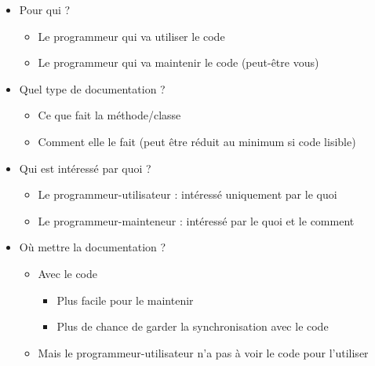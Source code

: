 \documentclass[11pt,a4paper]{article}
\begin{document}
					\begin{itemize}
				
			\item 
            Pour qui ?
            
					\begin{itemize}
				
			\item Le programmeur qui va utiliser le code
			\item Le programmeur qui va maintenir le code (peut-\^etre vous)
					\end{itemize}
				
			\item 
              Quel type de documentation ?
            
					\begin{itemize}
				
			\item Ce que fait la m\'ethode/classe
			\item Comment elle le fait (peut \^etre r\'eduit au minimum si code lisible)
					\end{itemize}
				
			\item 
              Qui est int\'eress\'e par quoi ?
            
					\begin{itemize}
				
			\item Le programmeur-utilisateur : int\'eress\'e uniquement par le quoi
			\item Le programmeur-mainteneur : int\'eress\'e par le quoi et le comment
					\end{itemize}
				
			\item 
              O\`u mettre la documentation ?
            
					\begin{itemize}
				
			\item 
                Avec le code
                  
					\begin{itemize}
				
			\item Plus facile pour le maintenir
			\item Plus de chance de garder la synchronisation avec le code
					\end{itemize}
				
			\item Mais le programmeur-utilisateur n'a pas \`a voir le code pour l'utiliser
					\end{itemize}
				
					\end{itemize}
				
\end{document}
